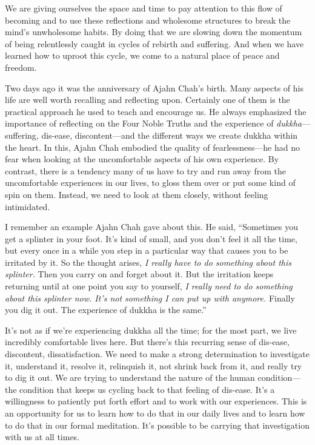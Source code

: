 We are giving ourselves the space and time to pay attention to this 
flow of becoming and to use these reflections and wholesome structures 
to break the mind's unwholesome habits. By doing that we are slowing 
down the momentum of being relentlessly caught in cycles of rebirth and 
suffering. And when we have learned how to uproot this cycle, we come 
to a natural place of peace and freedom.


Two days ago it was the anniversary of Ajahn Chah's birth. Many aspects 
of his life are well worth recalling and reflecting upon. Certainly one 
of them is the practical approach he used to teach and encourage us. He 
always emphasized the importance of reflecting on the Four Noble Truths 
and the experience of \emph{dukkha}---suffering, dis-ease, 
discontent---and the different ways we create dukkha within the heart. 
In this, Ajahn Chah embodied the quality of fearlessness---he had no 
fear when looking at the uncomfortable aspects of his own experience. 
By contrast, there is a tendency many of us have to try and run away 
from the uncomfortable experiences in our lives, to gloss them over or 
put some kind of spin on them. Instead, we need to look at them 
closely, without feeling intimidated.

I remember an example Ajahn Chah gave about this. He said, ``Sometimes 
you get a splinter in your foot. It's kind of small, and you don't feel 
it all the time, but every once in a while you step in a particular way 
that causes you to be irritated by it. So the thought arises, \emph{I 
really have to do something about this splinter.} Then you carry on and 
forget about it. But the irritation keeps returning until at one point 
you say to yourself, \emph{I really need to do something about this 
splinter now. It's not something I can put up with anymore.} Finally 
you dig it out. The experience of dukkha is the same.''

It's not as if we're experiencing dukkha all the time; for the most 
part, we live incredibly comfortable lives here. But there's this 
recurring sense of dis-ease, discontent, dissatisfaction. We need to 
make a strong determination to investigate it, understand it, resolve 
it, relinquish it, not shrink back from it, and really try to dig it 
out. We are trying to understand the nature of the human 
condition---the condition that keeps us cycling back to that feeling of 
dis-ease. It's a willingness to patiently put forth effort and to work 
with our experiences. This is an opportunity for us to learn how to do 
that in our daily lives and to learn how to do that in our formal 
meditation. It's possible to be carrying that investigation with us at 
all times.

